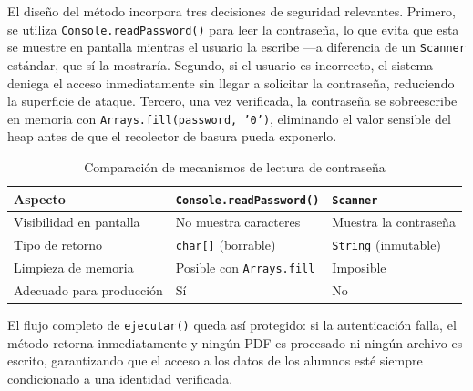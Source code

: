 El diseño del método incorpora tres decisiones de seguridad relevantes. Primero, se utiliza
\texttt{Console.readPassword()} para leer la contraseña, lo que evita que esta se muestre
en pantalla mientras el usuario la escribe ---a diferencia de un \texttt{Scanner} estándar,
que sí la mostraría. Segundo, si el usuario es incorrecto, el sistema deniega el acceso
inmediatamente sin llegar a solicitar la contraseña, reduciendo la superficie de ataque.
Tercero, una vez verificada, la contraseña se sobreescribe en memoria con
\texttt{Arrays.fill(password, '0')}, eliminando el valor sensible del heap antes de que
el recolector de basura pueda exponerlo.

\begin{table}[H]
\centering
\caption{Comparación de mecanismos de lectura de contraseña}
\label{tab:secure-auth-comparacion}
\begin{tabular}{|p{4cm}|p{4.5cm}|p{4cm}|}
\hline
\textbf{Aspecto} & \textbf{\texttt{Console.readPassword()}} & \textbf{\texttt{Scanner}} \\
\hline
Visibilidad en pantalla & No muestra caracteres & Muestra la contraseña \\
\hline
Tipo de retorno & \texttt{char[]} (borrable) & \texttt{String} (inmutable) \\
\hline
Limpieza de memoria & Posible con \texttt{Arrays.fill} & Imposible \\
\hline
Adecuado para producción & Sí & No \\
\hline
\end{tabular}
\end{table}

El flujo completo de \texttt{ejecutar()} queda así protegido: si la autenticación falla,
el método retorna inmediatamente y ningún PDF es procesado ni ningún archivo es escrito,
garantizando que el acceso a los datos de los alumnos esté siempre condicionado a una
identidad verificada.
